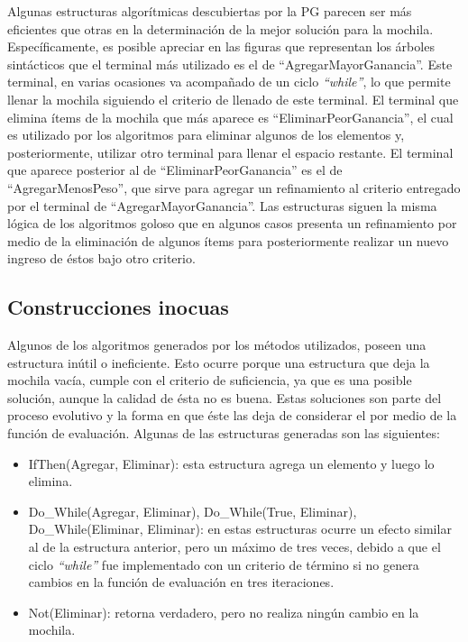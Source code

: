 
Algunas estructuras algorítmicas descubiertas por la PG parecen ser más eficientes que otras en la determinación de la mejor solución para la mochila. Específicamente, es posible apreciar en las figuras que representan los árboles sintácticos que el terminal más utilizado es el de “AgregarMayorGanancia”. Este terminal, en varias ocasiones va acompañado de un ciclo \textit{“while”}, lo que permite llenar la mochila siguiendo el criterio de llenado de este terminal. El terminal que elimina ítems de la mochila que más aparece es “EliminarPeorGanancia”, el cual es utilizado por los algoritmos para eliminar algunos de los elementos y, posteriormente, utilizar otro terminal para llenar el espacio restante. El terminal que aparece posterior al de “EliminarPeorGanancia” es el de “AgregarMenosPeso”, que sirve para agregar un refinamiento al criterio entregado por el terminal de “AgregarMayorGanancia”. Las estructuras siguen la misma lógica de los algoritmos goloso que en algunos casos presenta un refinamiento por medio de la eliminación de algunos ítems para posteriormente realizar un nuevo ingreso de éstos bajo otro criterio.

\subsection{Construcciones inocuas}

Algunos de los algoritmos generados por los métodos utilizados, poseen una estructura inútil o ineficiente. Esto ocurre porque una estructura que deja la mochila vacía, cumple con el criterio de suficiencia, ya que es una posible solución, aunque la calidad de ésta no es buena. Estas soluciones son parte del proceso evolutivo y la forma en que éste las deja de considerar el por medio de la función de evaluación. Algunas de las estructuras generadas son las siguientes:
\begin{itemize}
	\item IfThen(Agregar, Eliminar): esta estructura agrega un elemento y luego lo elimina.
	\item Do\_While(Agregar, Eliminar), Do\_While(True, Eliminar), Do\_While(Eliminar, Eliminar): en estas estructuras ocurre un efecto similar al de la estructura anterior, pero un máximo de tres veces, debido a que el ciclo \textit{“while”} fue implementado con un criterio de término si no genera cambios en la función de evaluación en tres iteraciones.
	\item Not(Eliminar): retorna verdadero, pero no realiza ningún cambio en la mochila.
\end{itemize}

